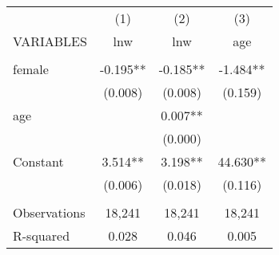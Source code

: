 \begin{tabular}{lccc} \hline
 & (1) & (2) & (3) \\
VARIABLES & lnw & lnw & age \\ \hline
 &  &  &  \\
female & -0.195** & -0.185** & -1.484** \\
 & (0.008) & (0.008) & (0.159) \\
age &  & 0.007** &  \\
 &  & (0.000) &  \\
Constant & 3.514** & 3.198** & 44.630** \\
 & (0.006) & (0.018) & (0.116) \\
 &  &  &  \\
Observations & 18,241 & 18,241 & 18,241 \\
 R-squared & 0.028 & 0.046 & 0.005 \\ \hline
\end{tabular}
